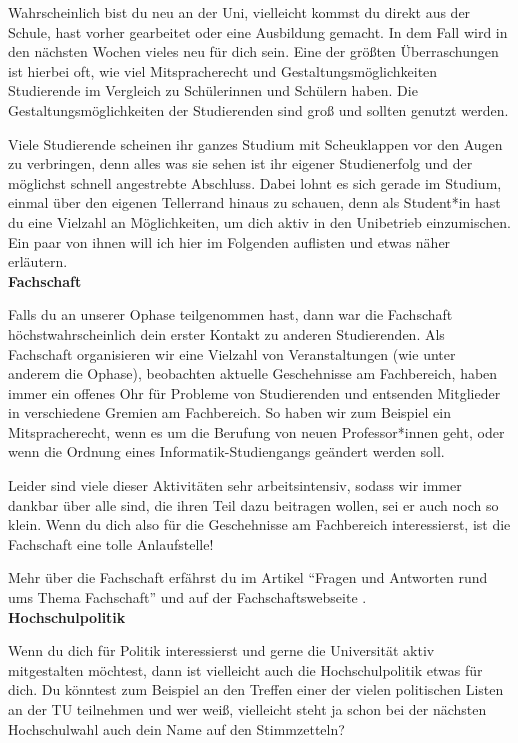 {Wahrscheinlich bist du neu an der Uni, vielleicht kommst du direkt aus der Schule, hast vorher gearbeitet oder eine Ausbildung gemacht. In dem Fall wird in den nächsten Wochen vieles neu für dich sein. Eine der größten Überraschungen ist hierbei oft, wie viel Mitspracherecht und Gestaltungsmöglichkeiten Studierende im Vergleich zu Schülerinnen und Schülern haben. Die Gestaltungsmöglichkeiten der Studierenden sind groß und sollten genutzt werden.
}{
    Viele Studierende scheinen ihr ganzes Studium mit Scheuklappen vor den Augen zu verbringen, denn alles was sie sehen ist ihr eigener Studienerfolg und der möglichst schnell angestrebte Abschluss. Dabei lohnt es sich gerade im Studium, einmal über den eigenen Tellerrand hinaus zu schauen, denn als Student*in hast du eine Vielzahl an Möglichkeiten, um dich aktiv in den Unibetrieb einzumischen. Ein paar von ihnen will ich hier im Folgenden auflisten und etwas näher erläutern.\\

    \textbf{Fachschaft}

    Falls du an unserer Ophase teilgenommen hast, dann war die Fachschaft höchstwahrscheinlich dein erster Kontakt zu anderen Studierenden. Als Fachschaft organisieren wir eine Vielzahl von Veranstaltungen (wie unter anderem die Ophase),  beobachten aktuelle Geschehnisse am Fachbereich, haben immer ein offenes Ohr für Probleme von Studierenden und entsenden Mitglieder in verschiedene Gremien am Fachbereich. So haben wir zum Beispiel ein Mitspracherecht, wenn es um die Berufung von neuen Professor*innen geht, oder wenn die Ordnung eines Informatik-Studiengangs geändert werden soll.

    Leider sind viele dieser Aktivitäten sehr arbeitsintensiv, sodass wir immer dankbar über alle sind, die ihren Teil dazu beitragen wollen, sei er auch noch so klein. Wenn du dich also für die Geschehnisse am Fachbereich interessierst, ist die Fachschaft eine tolle Anlaufstelle!

    Mehr über die Fachschaft erfährst du im Artikel "`Fragen und Antworten rund ums Thema Fachschaft"' und auf der Fachschaftswebseite \footnotemark[1].\\

    \textbf{Hochschulpolitik}

    Wenn du dich für Politik interessierst und gerne die Universität aktiv mitgestalten möchtest, dann ist vielleicht auch die Hochschulpolitik etwas für dich. Du könntest zum Beispiel an den Treffen einer der vielen politischen Listen an der TU teilnehmen und wer weiß, vielleicht steht ja schon bei der nächsten Hochschulwahl auch dein Name auf den Stimmzetteln?

}
